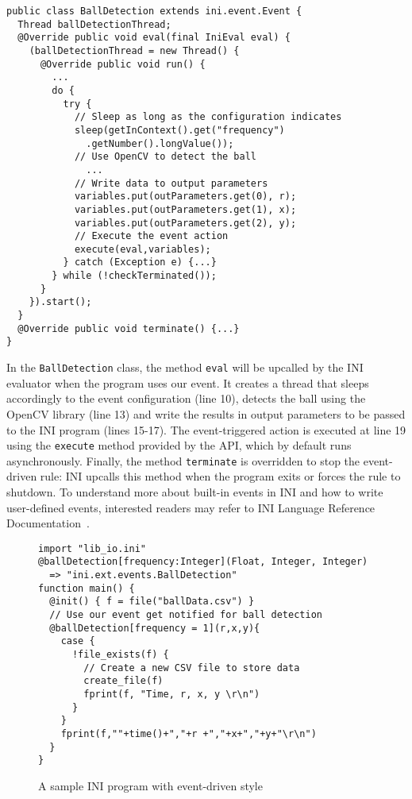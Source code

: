 \documentclass[runningheads,a4paper]{llncs}
\begin{document}
\begin{lstlisting}
public class BallDetection extends ini.event.Event {
  Thread ballDetectionThread;
  @Override public void eval(final IniEval eval) {
    (ballDetectionThread = new Thread() {
      @Override public void run() {
        ...
        do {
          try {
            // Sleep as long as the configuration indicates
            sleep(getInContext().get("frequency")
              .getNumber().longValue());
            // Use OpenCV to detect the ball
              ...
            // Write data to output parameters
            variables.put(outParameters.get(0), r);
            variables.put(outParameters.get(1), x);
            variables.put(outParameters.get(2), y);
            // Execute the event action
            execute(eval,variables);
          } catch (Exception e) {...}
        } while (!checkTerminated());	
      }
    }).start();
  }
  @Override public void terminate() {...}
}
\end{lstlisting}

In the \texttt{BallDetection} class, the method \texttt{eval} will be upcalled by the INI evaluator when the program uses our event. It creates a thread that sleeps accordingly to the event configuration (line 10), detects the ball using the OpenCV library (line 13) \cite{OpenCV} and write the results in output parameters to be passed to the INI program (lines 15-17). The event-triggered action is executed at line 19 using the \texttt{execute} method provided by the API, which by default runs asynchronously. Finally, the method \texttt{terminate} is overridden to stop the event-driven rule: INI upcalls this method when the program exits or forces the rule to shutdown. To understand more about built-in events in INI and how to write user-defined events, interested readers may refer to INI Language Reference Documentation~\cite{INI}.

\vspace{-10pt}

\begin{figure}[!h]
\begin{lstlisting}
import "lib_io.ini"
@ballDetection[frequency:Integer](Float, Integer, Integer)
  => "ini.ext.events.BallDetection"
function main() {
  @init() { f = file("ballData.csv") }
  // Use our event get notified for ball detection
  @ballDetection[frequency = 1](r,x,y){
    case {
      !file_exists(f) {
        // Create a new CSV file to store data
        create_file(f)
        fprint(f, "Time, r, x, y \r\n")
      }
    }
    fprint(f,""+time()+","+r +","+x+","+y+"\r\n")
  }
}
\end{lstlisting}
\centering
  \caption{A sample INI program with event-driven style}
  \label{fig:sample}
\end{figure}
\end{document}
